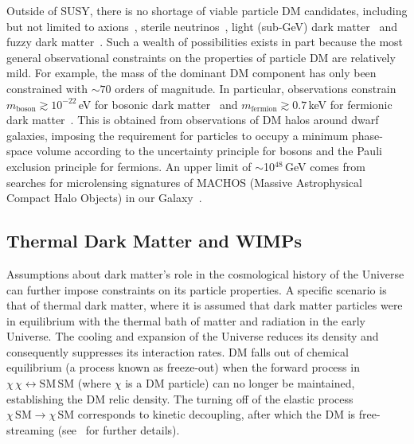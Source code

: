 Outside of SUSY, there is no shortage of viable particle DM candidates, including but not limited to axions~\cite{PhysRevLett.40.223,Peccei:1977hh}, sterile neutrinos~\cite{Abazajian:2001nj,Seljak:2006qw}, light (sub-GeV) dark matter~\cite{Feng:2008ya,Lin:2011gj} and fuzzy dark matter~\cite{Hui:2016ltb}. Such a wealth of possibilities exists in part because the most general observational constraints on the properties of particle DM are relatively mild. For example, the mass of the dominant DM component has only been constrained with $\sim70$ orders of magnitude. 
In particular, observations constrain $m_\text{boson} \gtrsim 10^{-22}$\,eV for bosonic dark matter~\cite{Zhang:2017chj} and $m_\text{fermion} \gtrsim 0.7$\,keV for fermionic dark matter~\cite{Horiuchi:2013noa}. This is obtained from observations of DM halos around dwarf galaxies, imposing the requirement for particles to occupy a minimum phase-space volume according to the uncertainty principle for bosons and the Pauli exclusion principle for fermions. An upper limit of $\sim$10$^{48}$\,GeV comes from searches for microlensing signatures of MACHOS (Massive Astrophysical Compact Halo Objects) in our Galaxy~\cite{Griest:2013aaa}.

\subsection{Thermal Dark Matter and WIMPs}

Assumptions about dark matter's role in the cosmological history of the Universe can further impose constraints on its particle properties. A specific scenario is that of thermal dark matter, where it is assumed that dark matter particles were in equilibrium with the thermal bath of matter and radiation in the early Universe. The cooling and expansion of the Universe reduces its density and consequently suppresses its interaction rates. DM falls out of chemical equilibrium (a process known as freeze-out) when the forward process in $\chi\,\chi\leftrightarrow\mathrm{SM}\,\mathrm{SM}$ (where $\chi$ is a DM particle) can no longer be maintained, establishing the DM relic density. The turning off of the elastic process $\chi\,\mathrm{SM}\rightarrow\chi\,\mathrm{SM}$ corresponds to kinetic decoupling, after which the DM is free-streaming (see~\cite{Bringmann:2006mu} for further details).

